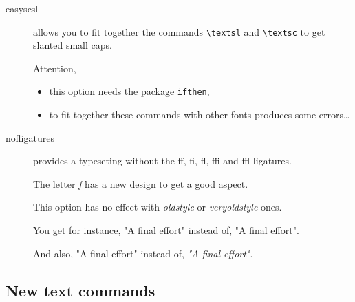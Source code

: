 \documentclass[a4paper,11pt]{article}
\begin{document}
\begin{description}
	
	\item[easyscsl] allows you to fit together the commands \verb=\textsl= and \verb=\textsc= to get slanted small caps.
	
				Attention,
				\begin{itemize}
					\item this option needs the package \texttt{ifthen},
					\item to fit together these commands with other fonts produces some errors\dots
				\end{itemize}
	\item[nofligatures] provides a typeseting without the ff, fi, fl, ffi and ffl ligatures.
	      
	      The letter \textit{f} has a new design to get a good aspect. 
	      
	      This option has no effect with \textit{oldstyle}
	      or \textit{veryoldstyle} ones.
	      
	      You get for instance, {\selectfont "A final effort"}
	      instead of, "A final effort".
	      
	      And also, {\selectfont "A final effort"}
	      instead of, \textit{"A final effort"}.
\end{description}

\subsection{New text commands}
\end{document}
